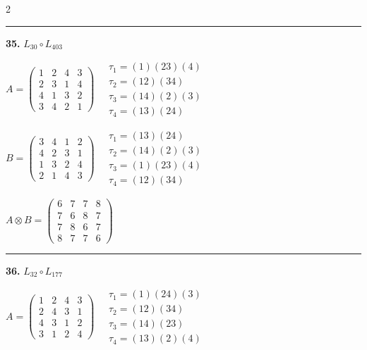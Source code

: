 \begin{multicols}{2}
\vspace{0.3em}
\hrule
\vspace{0.3em}

\noindent\textbf{35.} $L_{30} \circ L_{403}$

$A = \begin{pmatrix} 1 & 2 & 4 & 3 \\ 2 & 3 & 1 & 4 \\ 4 & 1 & 3 & 2 \\ 3 & 4 & 2 & 1 \end{pmatrix} \quad \begin{matrix} \tau_{1}=(1)(2 3)(4) \\ \tau_{2}=(1 2)(3 4) \\ \tau_{3}=(1 4)(2)(3) \\ \tau_{4}=(1 3)(2 4) \end{matrix}$

$B = \begin{pmatrix} 3 & 4 & 1 & 2 \\ 4 & 2 & 3 & 1 \\ 1 & 3 & 2 & 4 \\ 2 & 1 & 4 & 3 \end{pmatrix} \quad \begin{matrix} \tau_{1}=(1 3)(2 4) \\ \tau_{2}=(1 4)(2)(3) \\ \tau_{3}=(1)(2 3)(4) \\ \tau_{4}=(1 2)(3 4) \end{matrix}$

$A \otimes B = \begin{pmatrix} 6 & 7 & 7 & 8 \\ 7 & 6 & 8 & 7 \\ 7 & 8 & 6 & 7 \\ 8 & 7 & 7 & 6 \end{pmatrix}$

\vspace{0.3em}
\hrule
\vspace{0.3em}

\noindent\textbf{36.} $L_{32} \circ L_{177}$

$A = \begin{pmatrix} 1 & 2 & 4 & 3 \\ 2 & 4 & 3 & 1 \\ 4 & 3 & 1 & 2 \\ 3 & 1 & 2 & 4 \end{pmatrix} \quad \begin{matrix} \tau_{1}=(1)(2 4)(3) \\ \tau_{2}=(1 2)(3 4) \\ \tau_{3}=(1 4)(2 3) \\ \tau_{4}=(1 3)(2)(4) \end{matrix}$


\end{multicols}
